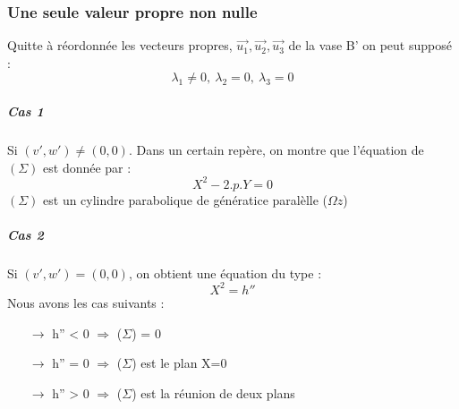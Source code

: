 \subsubsection{Une seule valeur propre non nulle}
Quitte à réordonnée les vecteurs propres, $\overrightarrow{u_1},\overrightarrow{u_2},\overrightarrow{u_3}$ de la vase B' on peut supposé :
$$\lambda_1 \neq 0,~ \lambda_2 = 0,~ \lambda_3=0$$
\subparagraph{Cas 1}
Si $(v',w') \neq (0,0)$. Dans un certain repère, on montre que l'équation de $(\Sigma)$ est donnée par : 
$$X^2 - 2.p.Y = 0$$
$(\Sigma)$ est un cylindre parabolique de génératice paralèlle ($\Omega z$)
\subparagraph{Cas 2}
Si $(v',w') = (0,0)$, on obtient une équation du type : 
$$X^2 = h''$$
Nous avons les cas suivants :
\begin{itemize}
 \item[$\rightarrow$] h'' < 0 $\Rightarrow$ ($\Sigma$) = 0
 \item[$\rightarrow$] h'' = 0 $\Rightarrow$ ($\Sigma$) est le plan X=0
 \item[$\rightarrow$] h'' > 0 $\Rightarrow$ ($\Sigma$) est la réunion de deux plans
\end{itemize}
